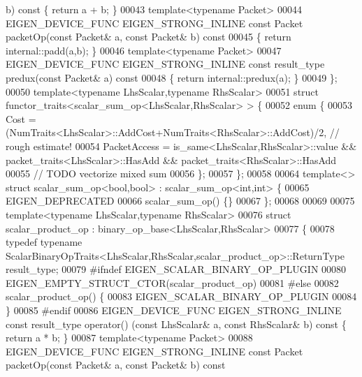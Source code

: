 \begin{DoxyCode}
      b)\textcolor{keyword}{ const }\{ \textcolor{keywordflow}{return} a + b; \}
00043   \textcolor{keyword}{template}<\textcolor{keyword}{typename} Packet>
00044   EIGEN\_DEVICE\_FUNC EIGEN\_STRONG\_INLINE \textcolor{keyword}{const} Packet packetOp(\textcolor{keyword}{const} Packet& a, \textcolor{keyword}{const} Packet& b)\textcolor{keyword}{ const}
00045 \textcolor{keyword}{  }\{ \textcolor{keywordflow}{return} internal::padd(a,b); \}
00046   \textcolor{keyword}{template}<\textcolor{keyword}{typename} Packet>
00047   EIGEN\_DEVICE\_FUNC EIGEN\_STRONG\_INLINE \textcolor{keyword}{const} result\_type predux(\textcolor{keyword}{const} Packet& a)\textcolor{keyword}{ const}
00048 \textcolor{keyword}{  }\{ \textcolor{keywordflow}{return} internal::predux(a); \}
00049 \};
00050 \textcolor{keyword}{template}<\textcolor{keyword}{typename} LhsScalar,\textcolor{keyword}{typename} RhsScalar>
00051 \textcolor{keyword}{struct }functor\_traits<scalar\_sum\_op<LhsScalar,RhsScalar> > \{
00052   \textcolor{keyword}{enum} \{
00053     Cost = (NumTraits<LhsScalar>::AddCost+NumTraits<RhsScalar>::AddCost)/2, \textcolor{comment}{// rough estimate!}
00054     PacketAccess = is\_same<LhsScalar,RhsScalar>::value && packet\_traits<LhsScalar>::HasAdd && 
      packet\_traits<RhsScalar>::HasAdd
00055     \textcolor{comment}{// TODO vectorize mixed sum}
00056   \};
00057 \};
00058 
00064 \textcolor{keyword}{template}<> \textcolor{keyword}{struct }scalar\_sum\_op<bool,bool> : scalar\_sum\_op<int,int> \{
00065   EIGEN\_DEPRECATED
00066   scalar\_sum\_op() \{\}
00067 \};
00068 
00069 
00075 \textcolor{keyword}{template}<\textcolor{keyword}{typename} LhsScalar,\textcolor{keyword}{typename} RhsScalar>
00076 \textcolor{keyword}{struct }scalar\_product\_op  : binary\_op\_base<LhsScalar,RhsScalar>
00077 \{
00078   \textcolor{keyword}{typedef} \textcolor{keyword}{typename} ScalarBinaryOpTraits<LhsScalar,RhsScalar,scalar\_product\_op>::ReturnType result\_type;
00079 \textcolor{preprocessor}{#ifndef EIGEN\_SCALAR\_BINARY\_OP\_PLUGIN}
00080   EIGEN\_EMPTY\_STRUCT\_CTOR(scalar\_product\_op)
00081 \textcolor{preprocessor}{#else}
00082   scalar\_product\_op() \{
00083     EIGEN\_SCALAR\_BINARY\_OP\_PLUGIN
00084   \}
00085 \textcolor{preprocessor}{#endif}
00086   EIGEN\_DEVICE\_FUNC EIGEN\_STRONG\_INLINE \textcolor{keyword}{const} result\_type operator() (\textcolor{keyword}{const} LhsScalar& a, \textcolor{keyword}{const} RhsScalar& 
      b)\textcolor{keyword}{ const }\{ \textcolor{keywordflow}{return} a * b; \}
00087   \textcolor{keyword}{template}<\textcolor{keyword}{typename} Packet>
00088   EIGEN\_DEVICE\_FUNC EIGEN\_STRONG\_INLINE \textcolor{keyword}{const} Packet packetOp(\textcolor{keyword}{const} Packet& a, \textcolor{keyword}{const} Packet& b)\textcolor{keyword}{ const}

\end{DoxyCode}

